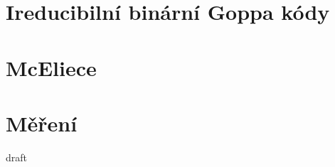 \documentclass[thesis=M,czech,hidelinks]{FITthesis}[2012/06/26]
\newcommand{\0}{{\textcolor[gray]{0.80}{0}}}
\begin{document}
\section{Ireducibilní binární Goppa kódy}

\section{McEliece}

\section{Měření}




\begin{conclusion}
    draft \cite{Schanck}
\end{conclusion}




\end{document}
